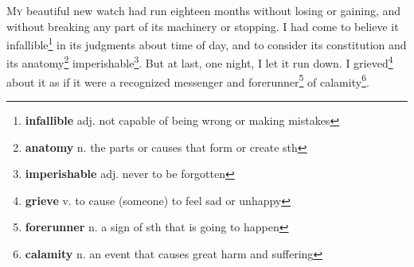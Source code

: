 \lettrine{M}{y} beautiful new watch had run eighteen months without losing or gaining, and without breaking any part of its machinery or stopping. I had come to believe it infallible\footnote{\textbf{infallible} adj. not capable of being wrong or making mistakes} in its judgments about time of day, and to consider its constitution and its anatomy\footnote{\textbf{anatomy} n. the parts or causes that form or create sth} imperishable\footnote{\textbf{imperishable} adj. never to be forgotten}. But at last, one night, I let it run down. I grieved\footnote{\textbf{grieve} v. to cause (someone) to feel sad or unhappy} about it as if it were a recognized messenger and forerunner\footnote{\textbf{forerunner} n. a sign of sth that is going to happen} of calamity\footnote{\textbf{calamity} n. an event that causes great harm and suffering}.
